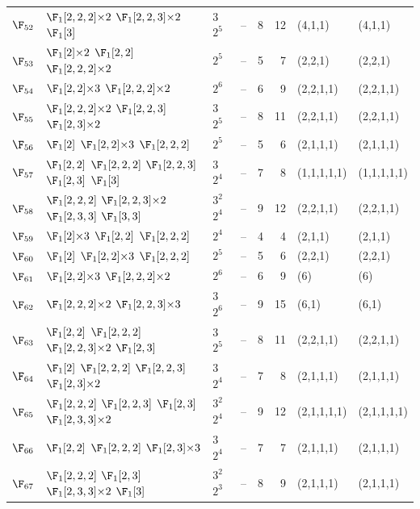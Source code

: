 \begin{landscape}
{\begin{longtable}{@{}l p{8.2cm} l l r r l l@{}}
$\F_{52}$ & $\F_{1}[2,2,2]{\times}2$\; $\F_{1}[2,2,3]{\times}2$\; $\F_{1}[3]$ & $3$\,$2^{5}$ & -- & 8 & 12 & (4,1,1) & (4,1,1) \\
$\F_{53}$ & $\F_{1}[2]{\times}2$\; $\F_{1}[2,2]$\; $\F_{1}[2,2,2]{\times}2$ & $2^{5}$ & -- & 5 & 7 & (2,2,1) & (2,2,1) \\
$\F_{54}$ & $\F_{1}[2,2]{\times}3$\; $\F_{1}[2,2,2]{\times}2$ & $2^{6}$ & -- & 6 & 9 & (2,2,1,1) & (2,2,1,1) \\
$\F_{55}$ & $\F_{1}[2,2,2]{\times}2$\; $\F_{1}[2,2,3]$\; $\F_{1}[2,3]{\times}2$ & $3$\,$2^{5}$ & -- & 8 & 11 & (2,2,1,1) & (2,2,1,1) \\
$\F_{56}$ & $\F_{1}[2]$\; $\F_{1}[2,2]{\times}3$\; $\F_{1}[2,2,2]$ & $2^{5}$ & -- & 5 & 6 & (2,1,1,1) & (2,1,1,1) \\
$\F_{57}$ & $\F_{1}[2,2]$\; $\F_{1}[2,2,2]$\; $\F_{1}[2,2,3]$\; $\F_{1}[2,3]$\; $\F_{1}[3]$ & $3$\,$2^{4}$ & -- & 7 & 8 & (1,1,1,1,1) & (1,1,1,1,1) \\
$\F_{58}$ & $\F_{1}[2,2,2]$\; $\F_{1}[2,2,3]{\times}2$\; $\F_{1}[2,3,3]$\; $\F_{1}[3,3]$ & $3^{2}$\,$2^{4}$ & -- & 9 & 12 & (2,2,1,1) & (2,2,1,1) \\
$\F_{59}$ & $\F_{1}[2]{\times}3$\; $\F_{1}[2,2]$\; $\F_{1}[2,2,2]$ & $2^{4}$ & -- & 4 & 4 & (2,1,1) & (2,1,1) \\
$\F_{60}$ & $\F_{1}[2]$\; $\F_{1}[2,2]{\times}3$\; $\F_{1}[2,2,2]$ & $2^{5}$ & -- & 5 & 6 & (2,2,1) & (2,2,1) \\
$\F_{61}$ & $\F_{1}[2,2]{\times}3$\; $\F_{1}[2,2,2]{\times}2$ & $2^{6}$ & -- & 6 & 9 & (6) & (6) \\
$\F_{62}$ & $\F_{1}[2,2,2]{\times}2$\; $\F_{1}[2,2,3]{\times}3$ & $3$\,$2^{6}$ & -- & 9 & 15 & (6,1) & (6,1) \\
$\F_{63}$ & $\F_{1}[2,2]$\; $\F_{1}[2,2,2]$\; $\F_{1}[2,2,3]{\times}2$\; $\F_{1}[2,3]$ & $3$\,$2^{5}$ & -- & 8 & 11 & (2,2,1,1) & (2,2,1,1) \\
$\F_{64}$ & $\F_{1}[2]$\; $\F_{1}[2,2,2]$\; $\F_{1}[2,2,3]$\; $\F_{1}[2,3]{\times}2$ & $3$\,$2^{4}$ & -- & 7 & 8 & (2,1,1,1) & (2,1,1,1) \\
$\F_{65}$ & $\F_{1}[2,2,2]$\; $\F_{1}[2,2,3]$\; $\F_{1}[2,3]$\; $\F_{1}[2,3,3]{\times}2$ & $3^{2}$\,$2^{4}$ & -- & 9 & 12 & (2,1,1,1,1) & (2,1,1,1,1) \\
$\F_{66}$ & $\F_{1}[2,2]$\; $\F_{1}[2,2,2]$\; $\F_{1}[2,3]{\times}3$ & $3$\,$2^{4}$ & -- & 7 & 7 & (2,1,1,1) & (2,1,1,1) \\
$\F_{67}$ & $\F_{1}[2,2,2]$\; $\F_{1}[2,3]$\; $\F_{1}[2,3,3]{\times}2$\; $\F_{1}[3]$ & $3^{2}$\,$2^{3}$ & -- & 8 & 9 & (2,1,1,1) & (2,1,1,1) \\

\end{longtable}}
\end{landscape}
